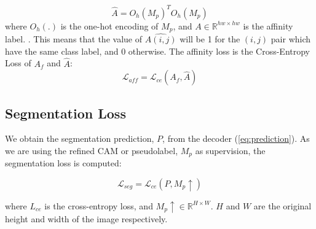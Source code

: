 \begin{equation}
    \hat{A} = O_h(M_p)^TO_h(M_p)
\end{equation}
where $O_h(.)$ is the one-hot encoding of $M_p$, and $A \in \mathbb{R}^{hw \times hw}$  is the affinity label.
. This means that the value of $\hat{A(i,j)}$ will be 1 for the $(i,j)$ pair which have the same class label, and 0 otherwise. The affinity loss is the Cross-Entropy Loss of $A_f$ and $\hat{A}$:
\begin{equation}
    \mathcal{L}_{aff} = \mathcal{L}_{ce}(A_f, \hat{A})
\end{equation}

\subsection{Segmentation Loss}
\label{seg_loss}
We obtain the segmentation prediction, $P$, from the decoder (\autoref{eq:prediction}). As we are using the refined CAM or pseudolabel, $M_p$ as supervision, the segmentation loss is computed:

\begin{equation}
    \mathcal{L}_{seg} = \mathcal{L}_{ce}(P, M_p \uparrow)
\end{equation}

where \( L_{ce} \) is the cross-entropy loss, and \( M_p{\uparrow} \in \mathbb{R}^{H \times W} \). $H$ and $W$ are the original height and width of the image respectively.


